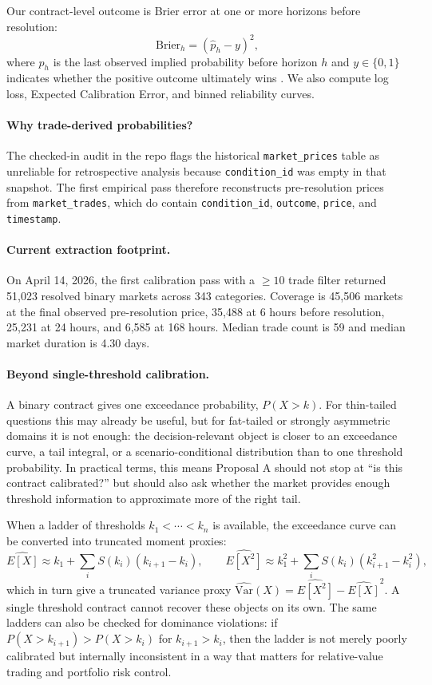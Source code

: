 \documentclass[10pt]{article}
\begin{document}
Our contract-level outcome is Brier error at one or more horizons before
resolution:
\[
\text{Brier}_h = (\hat p_h - y)^2,
\]
where $\hat p_h$ is the last observed implied probability before horizon $h$ and
$y \in \{0,1\}$ indicates whether the positive outcome ultimately wins
\citep{brier1950verification}. We also compute log loss, Expected Calibration
Error, and binned reliability curves.

\paragraph{Why trade-derived probabilities?}
The checked-in audit in the repo flags the historical \texttt{market\_prices}
table as unreliable for retrospective analysis because \texttt{condition\_id}
was empty in that snapshot. The first empirical pass therefore reconstructs
pre-resolution prices from \texttt{market\_trades}, which do contain
\texttt{condition\_id}, \texttt{outcome}, \texttt{price}, and
\texttt{timestamp}.

\paragraph{Current extraction footprint.}
On April 14, 2026, the first calibration pass with a $\geq 10$ trade filter
returned 51{,}023 resolved binary markets across 343 categories. Coverage is
45{,}506 markets at the final observed pre-resolution price, 35{,}488 at 6
hours before resolution, 25{,}231 at 24 hours, and 6{,}585 at 168 hours.
Median trade count is 59 and median market duration is 4.30 days.

\paragraph{Beyond single-threshold calibration.}
A binary contract gives one exceedance probability, $P(X > k)$. For thin-tailed
questions this may already be useful, but for fat-tailed or strongly asymmetric
domains it is not enough: the decision-relevant object is closer to an
exceedance curve, a tail integral, or a scenario-conditional distribution than
to one threshold probability. In practical terms, this means Proposal A should
not stop at ``is this contract calibrated?'' but should also ask whether the
market provides enough threshold information to approximate more of the right
tail.

When a ladder of thresholds $k_1 < \cdots < k_n$ is available, the exceedance
curve can be converted into truncated moment proxies:
\[
\widehat{E[X]} \approx k_1 + \sum_i S(k_i)(k_{i+1}-k_i), \qquad
\widehat{E[X^2]} \approx k_1^2 + \sum_i S(k_i)(k_{i+1}^2-k_i^2),
\]
which in turn give a truncated variance proxy
$\widehat{\mathrm{Var}}(X)=\widehat{E[X^2]}-\widehat{E[X]}^2$. A single
threshold contract cannot recover these objects on its own.
The same ladders can also be checked for dominance violations: if
$P(X>k_{i+1}) > P(X>k_i)$ for $k_{i+1} > k_i$, then the ladder is not merely
poorly calibrated but internally inconsistent in a way that matters for
relative-value trading and portfolio risk control.
\end{document}
